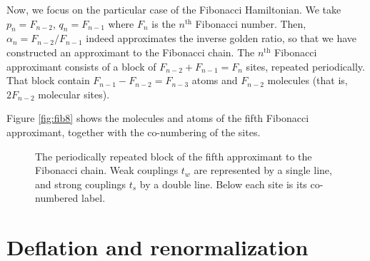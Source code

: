 \documentclass[aps,prl,preprint]{revtex4-1}
\begin{document}
Now, we focus on the particular case of the Fibonacci Hamiltonian. 
We take $p_n = F_{n-2}$, $q_n = F_{n-1}$ where $F_n$ is the $n^\text{th}$ Fibonacci number. Then, $\alpha_n = F_{n-2}/F_{n-1}$ indeed approximates the inverse golden ratio, so that we have constructed an approximant to the Fibonacci chain.
The $n^\text{th}$ Fibonacci approximant consists of a block of $F_{n-2} + F_{n-1} = F_{n}$ sites, repeated periodically. That block contain $F_{n-1} - F_{n-2} = F_{n-3}$ atoms and $F_{n-2}$ molecules (that is, $2F_{n-2}$ molecular sites).

Figure \eqref{fig:fib8} shows the molecules and atoms of the fifth Fibonacci approximant, together with the co-numbering of the sites.

\begin{figure}[htp]
	
	\caption{The periodically repeated block of the fifth approximant to the Fibonacci chain. Weak couplings $t_w$ are represented by a single line, and strong couplings $t_s$ by a double line. Below each site is its co-numbered label.}
\label{fig:fib8}
\end{figure}

\section{Deflation and renormalization}
\end{document}
